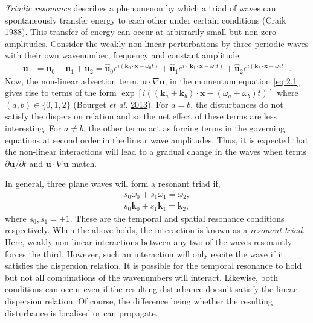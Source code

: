 \documentclass[a4paper]{article}
\numberwithin{equation}{section}
\begin{document}
\emph{Triadic resonance} describes a phenomenon by which a triad of waves can spontaneously transfer energy to each other under certain conditions (Craik \hyperlink{ref 32}{1988}). This transfer of energy can occur at arbitrarily small but non-zero amplitudes. Consider the weakly non-linear perturbations by three periodic waves with their own wavenumber, frequency and constant amplitude:
\begin{align}
\mathbf{u} &= \mathbf{u}_0 + \mathbf{u}_1 + \mathbf{u}_2 
= \mathbf{\hat{u}}_0 e^{i(\mathbf{k}_0 \cdot \boldsymbol{x} - \omega_0 t)} + \mathbf{\hat{u}}_1 e^{i(\mathbf{k}_1 \cdot \boldsymbol{x} - \omega_1 t)} + \mathbf{\hat{u}}_2 e^{i(\mathbf{k}_2 \cdot \boldsymbol{x} - \omega_2 t)}.
\end{align}
Now, the non-linear advection term, $\mathbf{u} \cdot \nabla \mathbf{u}$, in the momentum equation \eqref{eq:2.1} gives rise to terms of the form $\exp[i((\mathbf{k}_a \pm \mathbf{k}_b) \cdot \boldsymbol{x} - (\omega_a \pm \omega_b)t)]$ where $(a, b) \in \{0, 1, 2\}$ (Bourget \emph{et al.} \hyperlink{ref 33}{2013}). For $a = b$, the disturbances do not satisfy the dispersion relation and so the net effect of these terms are less interesting. For $a \neq b$, the other terms act as forcing terms in the governing equations at second order in the linear wave amplitudes. Thus, it is expected that the non-linear interactions will lead to a gradual change in the waves when terms $\partial \mathbf{u}/\partial t$ and $\mathbf{u} \cdot \nabla \mathbf{u}$ match.

In general, three plane waves will form a resonant triad if, 
\begin{align}
s_0\omega_0 + s_1 \omega_1 = \omega_2,\\
s_0 \mathbf{k}_0 + s_1 \mathbf{k}_1 = \mathbf{k}_2,
\end{align}
where $s_0, s_1 = \pm1$. These are the temporal and spatial resonance conditions respectively. When the above holds, the interaction is known as a \emph{resonant triad}. Here, weakly non-linear interactions between any two of the waves resonantly forces the third. However, such an interaction will only excite the wave if it satisfies the dispersion relation. It is possible for the temporal resonance to hold but not all combinations of the wavenumbers will interact. Likewise, both conditions can occur even if the resulting disturbance doesn't satisfy the linear dispersion relation. Of course, the difference being whether the resulting disturbance is localised or can propagate. 
\end{document}
